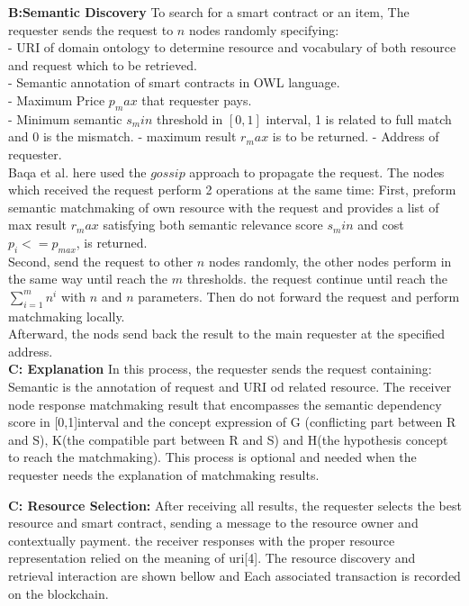 \textbf{B:Semantic Discovery }
To search for a smart contract or an item, The requester sends the request to $n$ nodes randomly specifying:\\
- URI of domain ontology to determine resource and vocabulary of both resource and request which to be retrieved.\\
- Semantic annotation of smart contracts in OWL language. \\
- Maximum Price $p_max$ that requester pays.\\
- Minimum semantic $s_min$ threshold in $[0,1]$ interval, 1 is related to full match and 0 is the mismatch. 
- maximum result $r_max$ is to be returned.
- Address of requester. \\ 
Baqa et al. here used the $gossip$ approach to propagate the request. The nodes which received the request perform 2 operations at the same time: First, preform semantic matchmaking of own resource with the request and provides a list of max result $r_max$ satisfying both semantic relevance score $s_min$ and cost $p_i <= p_{max}$, is returned.\\
Second, send the request to other $n$ nodes randomly, the other nodes perform in the same way until reach the $m$ thresholds. the request continue until reach the $\sum_{i=1}^{m} n^i$ with $n$ and $n$ parameters. Then do not forward the request and perform matchmaking locally.\\
Afterward, the nods send back the result to the main requester at the specified address\cite{Baqa}.\\

\textbf{C: Explanation} In this process, the requester sends the request containing: Semantic is the annotation of request and URI od related resource. The receiver node response matchmaking result that encompasses the semantic dependency score in [0,1]interval and the concept expression of G (conflicting part between R and S), K(the compatible part between R and S) and H(the hypothesis concept to reach the matchmaking). This process is optional and needed when the requester needs the explanation of matchmaking results.

\textbf{C: Resource Selection:} After receiving all results, the requester selects the best resource and smart contract, sending a message to the resource owner and contextually payment. the receiver responses with the proper resource representation relied on the meaning of uri[4].
The resource discovery and retrieval interaction are shown bellow and Each associated transaction is recorded on the blockchain\cite{Ruta}.


